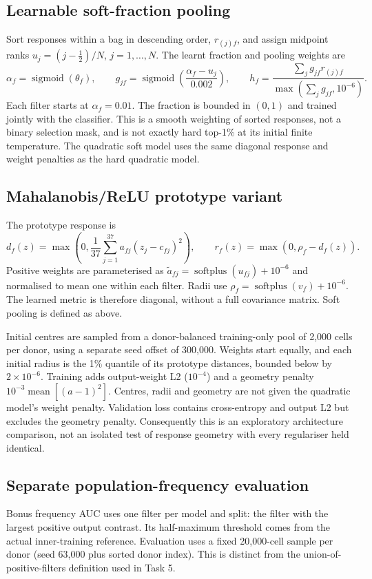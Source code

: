 \documentclass[11pt,a4paper]{article}
\begin{document}
\subsection{Learnable soft-fraction pooling}
Sort responses within a bag in descending order, $r_{(j)f}$, and assign midpoint ranks $u_j=(j-\tfrac12)/N$, $j=1,\ldots,N$. The learnt fraction and pooling weights are
\[
\alpha_f=\operatorname{sigmoid}(\theta_f),\qquad
g_{jf}=\operatorname{sigmoid}\left(\frac{\alpha_f-u_j}{0.002}\right),\qquad
h_f=\frac{\sum_jg_{jf}r_{(j)f}}{\max(\sum_jg_{jf},10^{-6})}.
\]
Each filter starts at $\alpha_f=0.01$. The fraction is bounded in $(0,1)$ and trained jointly with the classifier. This is a smooth weighting of sorted responses, not a binary selection mask, and is not exactly hard top-1\% at its initial finite temperature. The quadratic soft model uses the same diagonal response and weight penalties as the hard quadratic model.

\subsection{Mahalanobis/ReLU prototype variant}
The prototype response is
\[
d_f(z)=\max\left(0,\frac1{37}\sum_{j=1}^{37}a_{fj}(z_j-c_{fj})^2\right),
\qquad r_f(z)=\max(0,\rho_f-d_f(z)).
\]
Positive weights are parameterised as $\tilde a_{fj}=\operatorname{softplus}(u_{fj})+10^{-6}$ and normalised to mean one within each filter. Radii use $\rho_f=\operatorname{softplus}(v_f)+10^{-6}$. The learned metric is therefore diagonal, without a full covariance matrix. Soft pooling is defined as above.

Initial centres are sampled from a donor-balanced training-only pool of 2,000 cells per donor, using a separate seed offset of 300,000. Weights start equally, and each initial radius is the 1\% quantile of its prototype distances, bounded below by $2\times10^{-6}$. Training adds output-weight L2 ($10^{-4}$) and a geometry penalty $10^{-3}\operatorname{mean}[(a-1)^2]$. Centres, radii and geometry are not given the quadratic model's weight penalty. Validation loss contains cross-entropy and output L2 but excludes the geometry penalty. Consequently this is an exploratory architecture comparison, not an isolated test of response geometry with every regulariser held identical.

\subsection{Separate population-frequency evaluation}
Bonus frequency AUC uses one filter per model and split: the filter with the largest positive output contrast. Its half-maximum threshold comes from the actual inner-training reference. Evaluation uses a fixed 20,000-cell sample per donor (seed 63,000 plus sorted donor index). This is distinct from the union-of-positive-filters definition used in Task 5.
\end{document}
